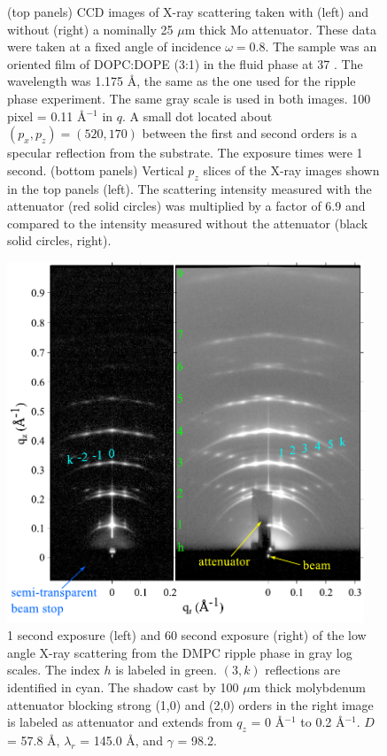 \begin{figure}[jtbp]
  \caption{(top panels) CCD images of X-ray scattering taken with (left) and without 
  (right) a nominally 25 $\mu$m thick Mo attenuator. These data were taken 
  at a fixed angle of incidence $\omega=0.8$\textdegree. The sample was an oriented film of 
  DOPC:DOPE (3:1) in the fluid phase at 37 \textcelsius. The wavelength
  was 1.175 \AA, the same as the one used for the ripple phase experiment.
  The same gray scale is used in both images. 100 pixel =  0.11 \AA$^{-1}$ in $q$. 
  A small dot located about $(p_x,p_z)=(520,170)$ between the first and second orders is 
  a specular reflection from the substrate. The exposure times were 1 second. 
  (bottom panels) Vertical $p_z$ slices of the X-ray images shown in the top panels (left).
  The scattering intensity measured with the attenuator (red solid circles) 
  was multiplied by a factor of 6.9 and compared to the intensity measured 
  without the attenuator (black solid circles, right).}
  \label{fig:olddopc}
\end{figure}

\begin{figure}[htbp]
  \centering
  \includegraphics[width=0.95\textwidth]{figures/ripple/ripple083and085}
  \caption{1 second exposure (left) and 60 second exposure (right) of the low
  angle X-ray scattering from the DMPC ripple phase in gray log scales. 
  The index $h$ is 
  labeled in green. $(3,k)$ reflections are identified in cyan. 
  The shadow cast by 100 $\mu$m thick molybdenum attenuator blocking
  strong (1,0) and (2,0) orders in the right image is labeled as attenuator
  and extends from $q_z$ = 0 \AA$^{-1}$ to 0.2 \AA$^{-1}$.
  $D$ = 57.8 \AA, $\lambda_r$ = 145.0 \AA, and $\gamma$ = 98.2\textdegree.}
  \label{fig:ripple_laxs_images}  
\end{figure} 

